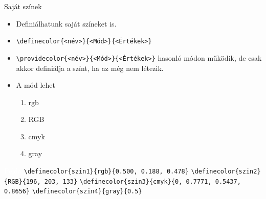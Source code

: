 \documentclass[aspectratio=1610, dvipsnames, xcolor=table]{beamer}
\begin{document}
    \begin{frame}[fragile]{Saját színek}
        \begin{itemize}
            \item {}Definiálhatunk saját színeket is.
            \item {}\verb!\definecolor{<név>}{<Mód>}{<Értékek>}!
            \item {}\verb!\providecolor{<név>}{<Mód>}{<Értékek>}! hasonló módon működik, de csak akkor definiálja a színt, ha az még nem létezik.
            \item {}A mód lehet
            \begin{enumerate}
                \item {}rgb
                \item {}RGB
                \item {}cmyk
                \item {}gray    
            \end{enumerate}
        \end{itemize}                                                        
        
        \begin{exampleblock}{\textcolor{white}{Példa}}
            \verb!\definecolor{szin1}{rgb}{0.500, 0.188, 0.478}! \hfill {}
            \verb!\definecolor{szin2}{RGB}{196, 203, 133}! \hfill {}
            \verb!\definecolor{szin3}{cmyk}{0, 0.7771, 0.5437, 0.8656}! \hfill {}
            \verb!\definecolor{szin4}{gray}{0.5}! \hfill {}    
        \end{exampleblock}           
    \end{frame}
    
\end{document}
